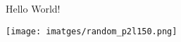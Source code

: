 \documentclass{article}
\begin{document}
Hello World!

\texttt{[image: imatges/random\_p2l150.png]}
\end{document}
